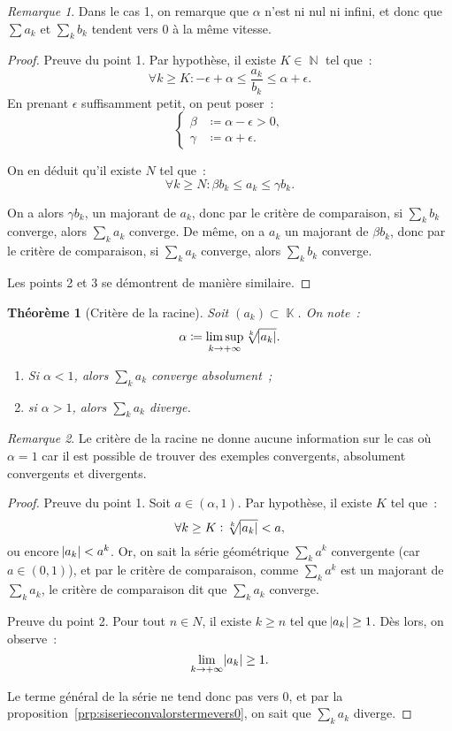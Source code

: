 \documentclass{article}
\DeclareMathOperator{\K}{\mathbb K}
\DeclareMathOperator{\N}{\mathbb N}
\newtheorem{thm}{Théorème}[section]
\theoremstyle{definition}
\theoremstyle{remark}
\newtheorem*{rmq}{Remarque}
\begin{document}
		\begin{rmq} Dans le cas 1, on remarque que $\alpha$ n'est ni nul ni infini, et donc que $\sum a_k$ et $\sum_k b_k$ tendent vers 0 à la même vitesse.
		\end{rmq}

		\begin{proof} Preuve du point 1. Par hypothèse, il existe $K \in \N$ tel que~:
		\[\forall k \geq K : -\epsilon + \alpha \leq \frac {a_k}{b_k} \leq \alpha + \epsilon.\]
		En prenant $\epsilon$ suffisamment petit, on peut poser~:
		\[\begin{cases}\beta &\coloneqq \alpha - \epsilon > 0, \\\gamma &\coloneqq \alpha + \epsilon.\end{cases}\]

		On en déduit qu'il existe $N$ tel que~:
		\[\forall k \geq N : \beta b_k \leq a_k \leq \gamma b_k.\]

		On a alors $\gamma b_k$, un majorant de $a_k$,  donc par le critère de comparaison, si $\sum_k b_k$ converge, alors $\sum_k a_k$ converge.
		De même, on a $a_k$ un majorant de $\beta b_k$, donc par le critère de comparaison, si $\sum_k a_k$ converge, alors $\sum_k b_k$ converge.

		Les points 2 et 3 se démontrent de manière similaire.
		\end{proof}

		\begin{thm}[Critère de la racine] Soit $(a_k) \subset \K$. On note~:
		\[\alpha \coloneqq \limsup_{k \to +\infty}\sqrt[k]{\abs {a_k}}.\]

		\begin{enumerate}
			\item Si $\alpha < 1$, alors $\sum_k a_k$ converge absolument~;
			\item si $\alpha > 1$, alors $\sum_k a_k$ diverge.
		\end{enumerate}
		\end{thm}

		\begin{rmq} Le critère de la racine ne donne aucune information sur le cas où $\alpha = 1$ car il est possible de trouver des exemples convergents,
		absolument convergents et divergents.
		\end{rmq}

		\begin{proof} Preuve du point 1. Soit $a \in (\alpha, 1)$. Par hypothèse, il existe $K$ tel que~:
		\[\forall k \geq K : \sqrt[k]{\abs {a_k}} < a,\]
		ou encore $\abs {a_k} < a^k$. Or, on sait la série géométrique $\sum_k a^k$ convergente (car $a \in (0, 1)$), et par le critère de comparaison, comme
		$\sum_k a^k$ est un majorant de $\sum_k a_k$, le critère de comparaison dit que $\sum_k a_k$ converge.

		Preuve du point 2. Pour tout $n \in N$, il existe $k \geq n$ tel que $\abs {a_k} \geq 1$. Dès lors, on observe~:
		\[\lim_{k \to +\infty}\abs {a_k} \geq 1.\]

		Le terme général de la série ne tend donc pas vers 0, et par la proposition~\ref{prp:siserieconvalorstermevers0}, on sait que $\sum_k a_k$ diverge.
		\end{proof}
\end{document}
